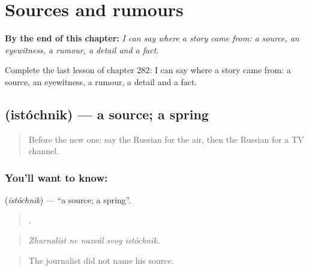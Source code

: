 
\chapter{Sources and rumours}
\label{ch:ru-sources-and-rumours}

\begin{chapteropening}
\textbf{By the end of this chapter:} \emph{I can say where a story came from: a source, an eyewitness, a rumour, a detail and a fact.}

Complete the last lesson of chapter 282: I can say where a story came from: a source, an eyewitness, a rumour, a detail and a fact.
\end{chapteropening}

\section[\texorpdfstring{\ru{источник} (istóchnik)}{источник (istóchnik)}]{ (istóchnik) — a source; a spring}

\label{lesson:RU-C282-istochnik}



\begin{quote}
Before the new one: say the Russian for the air, then the Russian for a TV channel.
\end{quote}

\subsection*{You'll want to know: }
\textbf{} (\emph{istóchnik}) — \textquotedblleft{}a source; a spring\textquotedblright{}.

\begin{quote}
    .
\end{quote}

\begin{quote}
\emph{Zhurnalíst ne nazvál svoy istóchnik.}
\end{quote}

\begin{quote}
The journalist did not name his source.
\end{quote}

